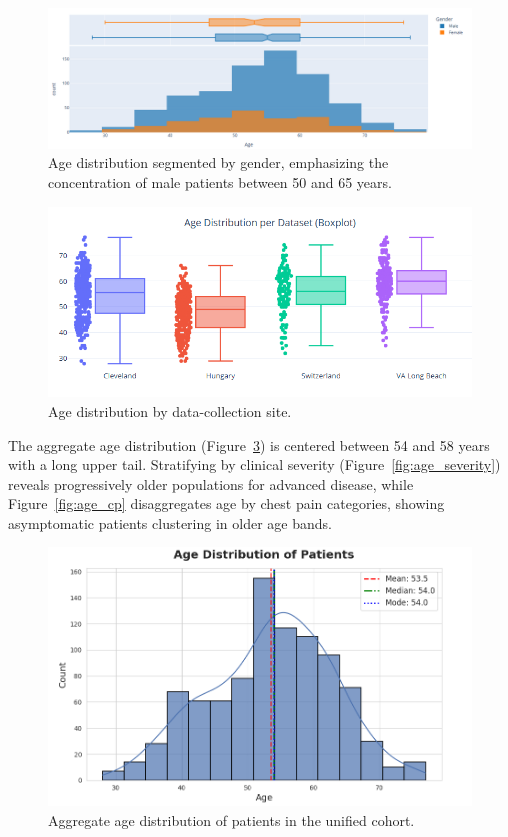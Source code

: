 \documentclass[conference]{IEEEtran}
\begin{document}
\begin{figure}[t]
  \centering
  \includegraphics[width=0.85\linewidth]{age_distribution_by_gender.png}
  \caption{Age distribution segmented by gender, emphasizing the concentration of male patients between 50 and 65 years.}
  \label{fig:age_gender}
\end{figure}

\begin{figure}[t]
  \centering
  \includegraphics[width=0.85\linewidth]{age_distribution_by_dataset_site.png}
  \caption{Age distribution by data-collection site.}
  \label{fig:site}
\end{figure}

The aggregate age distribution (Figure~\ref{fig:age_overall}) is centered between 54 and 58 years with a long upper tail. Stratifying by clinical severity (Figure~\ref{fig:age_severity}) reveals progressively older populations for advanced disease, while Figure~\ref{fig:age_cp} disaggregates age by chest pain categories, showing asymptomatic patients clustering in older age bands.

\begin{figure}[t]
  \centering
  \includegraphics[width=0.85\linewidth]{age_distribution_of_patients.png}
  \caption{Aggregate age distribution of patients in the unified cohort.}
  \label{fig:age_overall}
\end{figure}
\end{document}
